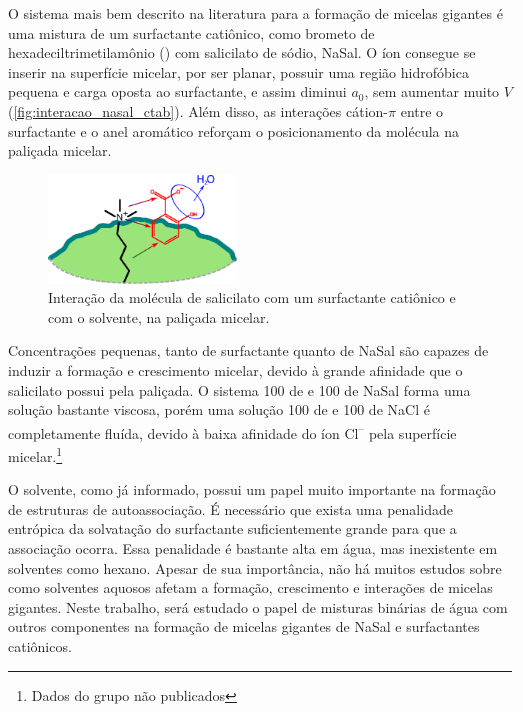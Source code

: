 	O sistema mais bem descrito na literatura para a formação de micelas gigantes é uma mistura de um surfactante catiônico, como brometo de hexadeciltrimetilamônio (\CTAB) com salicilato de sódio, NaSal.\cite{Dreiss2007} O íon \Sal{} consegue se inserir na superfície micelar, por ser planar, possuir uma região hidrofóbica pequena e carga oposta ao surfactante, e assim diminui \(a_0\), sem aumentar muito \(V\) (\autoref{fig:interacao_nasal_ctab}).\cite{Ito2014c} Além disso, as interações cátion-\(\pi\) entre o surfactante e o anel aromático\cite{Mahadevi2013a, Umeasiegbu2016} reforçam o posicionamento da molécula na paliçada micelar.   
	
	\begin{figure}[h]
		\centering
		\includegraphics[width=5cm]{imagens/introducao/interacao_nasal_ctab}
		\caption{Interação da molécula de salicilato com um surfactante catiônico e com o solvente, na paliçada micelar.}
		\label{fig:interacao_nasal_ctab} 
	\end{figure}
	
	Concentrações pequenas, tanto de surfactante quanto de NaSal são capazes de induzir a formação e crescimento micelar\cite{Sarac2013, Ito2015c}, devido à grande afinidade que o salicilato possui pela paliçada. O sistema 100 \mM{} de \CTAB{} e 100 \mM{} de NaSal forma uma solução bastante viscosa, porém uma solução 100 \mM{} de \CTAB{} e 100 \mM{} de NaCl é completamente fluída, devido à baixa afinidade do íon Cl\textsuperscript{--} pela superfície micelar.\footnote{Dados do grupo não publicados} 
	
	O solvente, como já informado, possui um papel muito importante na formação de estruturas de autoassociação. É necessário que exista uma penalidade entrópica da solvatação do surfactante suficientemente grande para que a associação ocorra. Essa penalidade é bastante alta em água, mas inexistente em solventes como hexano. Apesar de sua importância, não há muitos estudos sobre como solventes aquosos afetam a formação, crescimento e interações de micelas gigantes. Neste trabalho, será estudado o papel de misturas binárias de água com outros componentes na formação de micelas gigantes de NaSal e surfactantes catiônicos.
		
